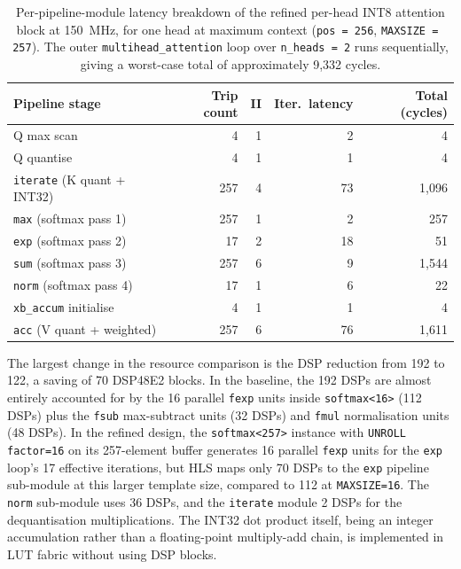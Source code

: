 \begin{table}[H]
  \centering
  \begin{tabular}{lrrrr}
    \toprule
    Pipeline stage & Trip count & II & Iter.\ latency & Total (cycles) \\
    \midrule
    Q max scan                            &   4 &  1 &  2 &    4 \\
    Q quantise                            &   4 &  1 &  1 &    4 \\
    \texttt{iterate} (K quant + INT32)    & 257 &  4 & 73 & 1{,}096 \\
    \texttt{max}     (softmax pass 1)     & 257 &  1 &  2 &  257 \\
    \texttt{exp}     (softmax pass 2)     &  17 &  2 & 18 &   51 \\
    \texttt{sum}     (softmax pass 3)     & 257 &  6 &  9 & 1{,}544 \\
    \texttt{norm}    (softmax pass 4)     &  17 &  1 &  6 &   22 \\
    \texttt{xb\_accum} initialise         &   4 &  1 &  1 &    4 \\
    \texttt{acc}     (V quant + weighted) & 257 &  6 & 76 & 1{,}611 \\
    \bottomrule
  \end{tabular}
  \caption{Per-pipeline-module latency breakdown of the refined per-head
           INT8 attention block at \SI{150}{\mega\hertz}, for one head at
           maximum context (\texttt{pos\,=\,256}, \texttt{MAXSIZE\,=\,257}).
           The outer \texttt{multihead\_attention} loop over
           \texttt{n\_heads\,=\,2} runs sequentially, giving a worst-case
           total of approximately 9{,}332 cycles.}
  \label{tab:attn_int8_latency}
\end{table}

The largest change in the resource comparison is the DSP
reduction from 192 to 122, a saving of 70 DSP48E2 blocks. In the
baseline, the 192 DSPs are almost entirely accounted for by the 16
parallel \texttt{fexp} units inside \texttt{softmax<16>} (112 DSPs)
plus the \texttt{fsub} max-subtract units (32 DSPs) and \texttt{fmul}
normalisation units (48 DSPs). In the refined design, the
\texttt{softmax<257>} instance with \texttt{UNROLL factor=16} on its
257-element buffer generates 16 parallel \texttt{fexp} units for the
\texttt{exp} loop's 17 effective iterations, but HLS maps only 70 DSPs
to the \texttt{exp} pipeline sub-module at this larger template size,
compared to 112 at \texttt{MAXSIZE=16}. The \texttt{norm} sub-module
uses 36 DSPs, and the \texttt{iterate} module 2 DSPs for the
dequantisation multiplications. The INT32 dot product itself, being
an integer accumulation rather than a floating-point multiply-add
chain, is implemented in LUT fabric without using DSP blocks.

